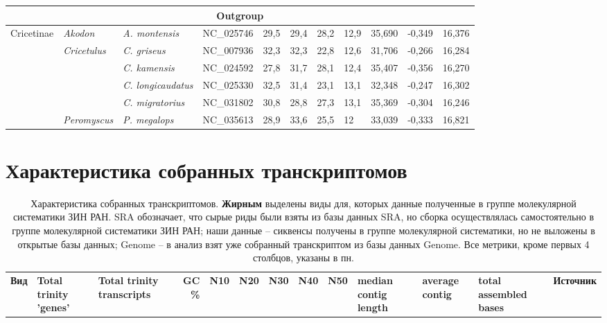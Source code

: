\begin{landscape}
\begin{longtable}{|l|l|l|c|c|c|c|c|c|c|c|}
				\multicolumn{11}{|c|}{Outgroup} \\ \hline
				\multirow{6}{*}{Cricetinae} & \textit{Akodon} & \textit{A. montensis} & NC\_025746 & 29,5 & 29,4 & 28,2 & 12,9 & 35,690 & -0,349 & 16,376 \\ \cline{2-11} 
				& \multirow{4}{*}{\textit{Cricetulus}} & \textit{C. griseus} & NC\_007936 & 32,3 & 32,3 & 22,8 & 12,6 & 31,706 & -0,266 & 16,284 \\ \cline{3-11} 
				&  & \textit{C. kamensis} & NC\_024592 & 27,8 & 31,7 & 28,1 & 12,4 & 35,407 & -0,356 & 16,270 \\ \cline{3-11} 
				&  & \textit{C. longicaudatus} & NC\_025330 & 32,5 & 31,4 & 23,1 & 13,1 & 32,348 & -0,247 & 16,302 \\ \cline{3-11} 
				&  & \textit{C. migratorius} & NC\_031802 & 30,8 & 28,8 & 27,3 & 13,1 & 35,369 & -0,304 & 16,246 \\ \cline{2-11} 
				& \textit{Peromyscus} & \textit{P. megalops} & \multicolumn{1}{l|}{NC\_035613} & \multicolumn{1}{l|}{28,9} & \multicolumn{1}{l|}{33,6} & \multicolumn{1}{l|}{25,5} & \multicolumn{1}{l|}{12} & 33,039 & -0,333 & 16,821 \\ \hline

\end{longtable}


\chapter{Характеристика собранных транскриптомов}
	
\begin{longtable}{|p{4.2cm}|p{1.5cm}|p{2.2cm}|p{1cm}|p{1cm}|p{1cm}|p{1cm}|p{1cm}|p{1cm}|p{1.5cm}|p{1.5cm}|p{2cm}|p{2.5cm}|}
	\caption{Характеристика собранных транскриптомов. \textbf{Жирным} выделены виды для, которых данные полученные в группе молекулярной систематики ЗИН РАН. SRA обозначает, что сырые риды были взяты из базы данных SRA, но сборка осуществлялась самостоятельно в группе молекулярной систематики ЗИН РАН; наши данные -- сиквенсы получены в группе молекулярной систематики, но не выложены в открытые базы данных; Genome -- в анализ взят уже собранный транскриптом из базы данных Genome. Все метрики, кроме первых 4 столбцов, указаны в пн.} \label{rna_stats} \vspace{5mm} \\
		
\hline
\multicolumn{1}{|c|}{\textbf{Вид}} & \multicolumn{1}{p{1cm}|}{\textbf{Total trinity 'genes'}} & \multicolumn{1}{p{1cm}|}{\textbf{Total trinity transcripts}} & \multicolumn{1}{r|}{\textbf{GC \%}} & \multicolumn{1}{c|}{\textbf{N10}} & \multicolumn{1}{c|}{\textbf{N20}} & \multicolumn{1}{c|}{\textbf{N30}} & \multicolumn{1}{c|}{\textbf{N40}} & \multicolumn{1}{c|}{\textbf{N50}} & \multicolumn{1}{p{1cm}|}{\textbf{median contig length}} & \multicolumn{1}{p{1cm}|}{\textbf{average contig}} & \multicolumn{1}{p{1cm}|}{\textbf{total assembled bases}} &\multicolumn{1}{p{1cm}|}{\textbf{Источник}} \\ \hline
		

\end{longtable}
\end{landscape}
